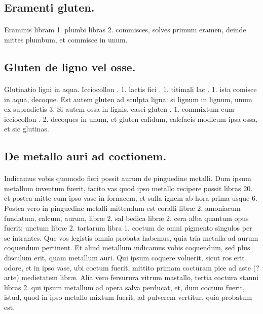 \documentclass[a4paper, 11pt, oneside, polutonikogreek, italian]{article}
\begin{document}
\subsection{Eramenti gluten.}
\paragraph{}
Eraminis libram 1. plumbi libras 2. commisces, solves primum eramen, deinde mittes plumbum, et commisce in unum.

\subsection{Gluten de ligno vel osse.}
\paragraph{}
Glutinatio ligni in aqua. Icciocollon \roundz. 1. lactis fici \roundz. 1. titimali lac \roundz. 1. ista comisce in aqua, decoque. Est autem gluten ad sculpta ligna: si lignum in lignum, unum ex supradictis 3. Si autem ossa in lignis, casei gluten \roundz. 1. commixtum cum icciocollon \roundz. 2. decoques in unum, et gluten calidum, calefacis modicum ipsa ossa, et sic glutinas.

\subsection{De metallo auri ad coctionem.}
\paragraph{}
Indicamus vobis quomodo fieri possit aurum de pinguedine metalli. Dum ipsum metallum inventum fuerit, facito vas quod ipso metallo recipere possit libras 20. et postea mitte cum ipso vase in fornacem, et sufla ignem ab hora prima usque 6. Postea vero in pinguedine metalli mittendum est coralli libræ 2. amoniacum fundatum, calcum, aurum, libræ 2. sal bedica libræ 2. cera alba quantum opus fuerit; unctum libræ 2. tartarum libra 1. coctum de omni pigmento singulos per se intrantes. Que vos legistis omnia probata habemus, quia tria metalla ad aurum coquendum pertinent. Et aliud metallum indicamus vobis coquendum, sed plus disculum erit, quam metallum auri. Qui ipsum coquere voluerit, sicut ros erit odore, et in ipso vase, ubi coctum fuerit, mittito primam cocturam pice ad aste (? arte) medietatem libræ. Alia vero fersurura vitrum mastallo, tertia coctura stanni libras 2. qui ipsum metallum ad opera salva perducat, et, dum coctum fuerit, istud, quod in ipso metallo mixtum fuerit, ad pulverem vertitur, quia probatum est.
\end{document}
